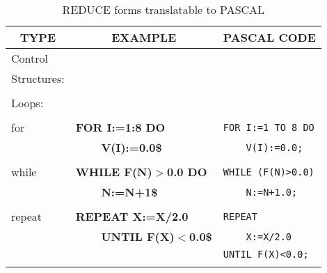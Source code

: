 \begin{table}
\begin{tabular}{||l|l|l||}\hline\hline
\multicolumn{1}{||c|}{\bf TYPE} & \multicolumn{1}{c|}{\bf EXAMPLE}
 & \multicolumn{1}{c||}{\bf PASCAL CODE} \\ \hline\hline
Control & & \\
Structures: & &\\
& & \\
  Loops: & &\\
& &\\
    for &{\bf FOR I:=1:8 DO} &\verb!FOR I:=1 TO 8 DO!\\
&{\bf \ \ \ \ V(I):=0.0\$} &\verb!    V(I):=0.0;!\\
& & \\
    while      &{\bf WHILE F(N)$>$0.0 DO} &\verb!WHILE (F(N)>0.0)!\\
&{\bf \ \ \ \ N:=N+1\$} &\verb!    N:=N+1.0;!\\
& & \\
   repeat     &{\bf REPEAT X:=X/2.0} &\verb!REPEAT!\\
&{\bf \ \ \ \ UNTIL F(X)$<$0.0\$} &\verb!    X:=X/2.0!\\
& &\verb!UNTIL F(X)<0.0;!\\
& & \\\hline\hline
\end{tabular}
\caption{REDUCE forms translatable to PASCAL}
\end{table}

